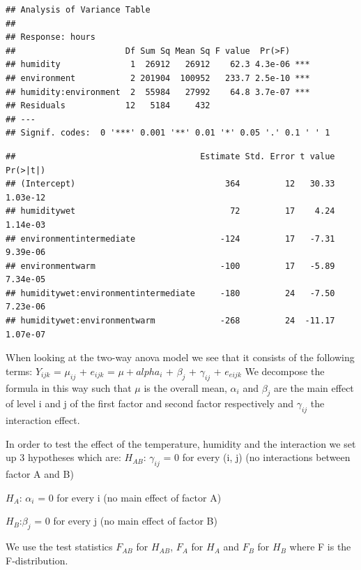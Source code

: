 \documentclass[
  10pt,
]{article}
\newenvironment{Shaded}{\begin{snugshade}}{\end{snugshade}}
\newcommand{\FunctionTok}[1]{\textcolor[rgb]{0.00,0.00,0.00}{#1}}
\newcommand{\NormalTok}[1]{#1}
\newcommand{\SpecialCharTok}[1]{\textcolor[rgb]{0.00,0.00,0.00}{#1}}
\begin{document}
\begin{verbatim}
## Analysis of Variance Table
## 
## Response: hours
##                      Df Sum Sq Mean Sq F value  Pr(>F)    
## humidity              1  26912   26912    62.3 4.3e-06 ***
## environment           2 201904  100952   233.7 2.5e-10 ***
## humidity:environment  2  55984   27992    64.8 3.7e-07 ***
## Residuals            12   5184     432                    
## ---
## Signif. codes:  0 '***' 0.001 '**' 0.01 '*' 0.05 '.' 0.1 ' ' 1
\end{verbatim}

\begin{Shaded}
\end{Shaded}

\begin{verbatim}
##                                     Estimate Std. Error t value Pr(>|t|)
## (Intercept)                              364         12   30.33 1.03e-12
## humiditywet                               72         17    4.24 1.14e-03
## environmentintermediate                 -124         17   -7.31 9.39e-06
## environmentwarm                         -100         17   -5.89 7.34e-05
## humiditywet:environmentintermediate     -180         24   -7.50 7.23e-06
## humiditywet:environmentwarm             -268         24  -11.17 1.07e-07
\end{verbatim}

When looking at the two-way anova model we see that it consists of the
following terms: \(Y_{ijk}\) = \(\mu_{ij}\) + \(e_{ijk}\) =
\(\mu + alpha_{i}\) + \(\beta_{j}\) + \(\gamma_{ij}\) + \(e_{eijk}\) We
decompose the formula in this way such that \(\mu\) is the overall mean,
\(\alpha_{i}\) and \(\beta_{j}\) are the main effect of level i and j of
the first factor and second factor respectively and \(\gamma_{ij}\) the
interaction effect.

In order to test the effect of the temperature, humidity and the
interaction we set up 3 hypotheses which are: \(H_{AB}\):
\(\gamma_{ij}\) = 0 for every (i, j) (no interactions between factor A
and B)

\(H_{A}\): \(\alpha_{i}\) = 0 for every i (no main effect of factor A)

\(H_{B}\):\(\beta_{j}\) = 0 for every j (no main effect of factor B)

We use the test statistics \(F_{AB}\) for \(H_{AB}\), \(F_{A}\) for
\(H_{A}\) and \(F_{B}\) for \(H_{B}\) where F is the F-distribution.
\end{document}
